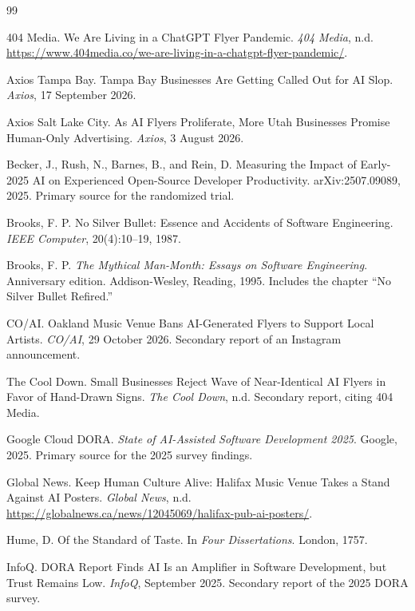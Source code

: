 \documentclass[11pt,a4paper]{article}
\theoremstyle{remark}
\begin{document}
\begin{thebibliography}{99}

404 Media. We Are Living in a ChatGPT Flyer Pandemic. \emph{404 Media}, n.d. \url{https://www.404media.co/we-are-living-in-a-chatgpt-flyer-pandemic/}.

Axios Tampa Bay. Tampa Bay Businesses Are Getting Called Out for AI Slop. \emph{Axios}, 17 September 2026.

Axios Salt Lake City. As AI Flyers Proliferate, More Utah Businesses Promise Human-Only Advertising. \emph{Axios}, 3 August 2026.

Becker, J., Rush, N., Barnes, B., and Rein, D. Measuring the Impact of Early-2025 AI on Experienced Open-Source Developer Productivity. arXiv:2507.09089, 2025. Primary source for the randomized trial.

Brooks, F. P. No Silver Bullet: Essence and Accidents of Software Engineering. \emph{IEEE Computer}, 20(4):10--19, 1987.

Brooks, F. P. \emph{The Mythical Man-Month: Essays on Software Engineering}. Anniversary edition. Addison-Wesley, Reading, 1995. Includes the chapter ``No Silver Bullet Refired.''

CO/AI. Oakland Music Venue Bans AI-Generated Flyers to Support Local Artists. \emph{CO/AI}, 29 October 2026. Secondary report of an Instagram announcement.

The Cool Down. Small Businesses Reject Wave of Near-Identical AI Flyers in Favor of Hand-Drawn Signs. \emph{The Cool Down}, n.d. Secondary report, citing 404 Media.

Google Cloud DORA. \emph{State of AI-Assisted Software Development 2025}. Google, 2025. Primary source for the 2025 survey findings.

Global News. Keep Human Culture Alive: Halifax Music Venue Takes a Stand Against AI Posters. \emph{Global News}, n.d. \url{https://globalnews.ca/news/12045069/halifax-pub-ai-posters/}.

Hume, D. Of the Standard of Taste. In \emph{Four Dissertations}. London, 1757.

InfoQ. DORA Report Finds AI Is an Amplifier in Software Development, but Trust Remains Low. \emph{InfoQ}, September 2025. Secondary report of the 2025 DORA survey.


\end{thebibliography}
\end{document}
